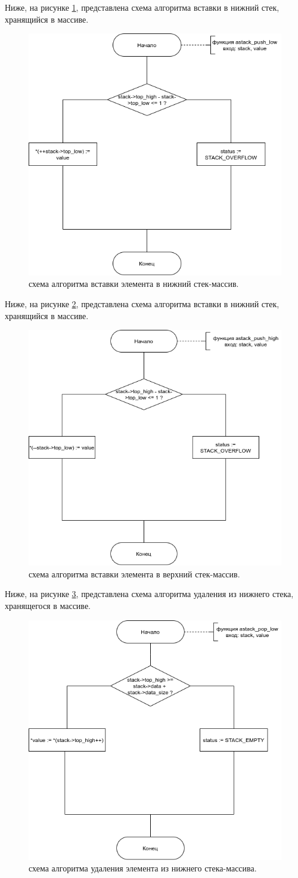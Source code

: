 \clearpage

Ниже, на рисунке \ref{alg:apush-l}, представлена схема алгоритма вставки в нижний стек, хранящийся в массиве.

\begin{figure}[h]
	\centering
	\includegraphics[width=0.5\linewidth]{img/algo-astack_push_low.png}
	\caption{схема алгоритма вставки элемента в нижний стек-массив.}
	\label{alg:apush-l}
\end{figure}

Ниже, на рисунке \ref{alg:apush-h}, представлена схема алгоритма вставки в нижний стек, хранящийся в массиве.

\begin{figure}[h]
	\centering
	\includegraphics[width=0.5\linewidth]{img/algo-astack_push_high.png}
	\caption{схема алгоритма вставки элемента в верхний стек-массив.}
	\label{alg:apush-h}
\end{figure}

\clearpage

Ниже, на рисунке \ref{alg:apop-l}, представлена схема алгоритма удаления из нижнего стека, хранящегося в массиве.

\begin{figure}[h]
	\centering
	\includegraphics[width=0.5\linewidth]{img/algo-astack_pop_high.png}
	\caption{схема алгоритма удаления элемента из нижнего стека-массива.}
	\label{alg:apop-l}
\end{figure}

